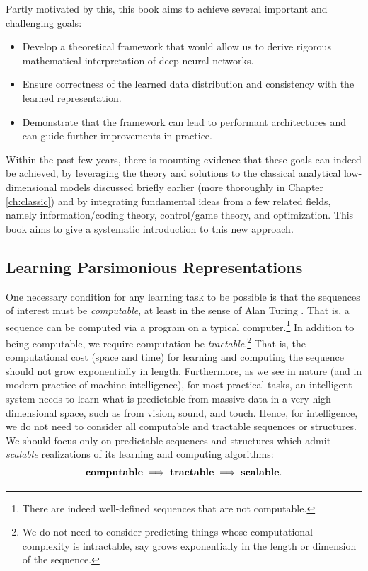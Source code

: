 \documentclass[../../book-main.tex]{subfiles}
\begin{document}
Partly motivated by this, this book aims to achieve several important and challenging goals: 
\begin{itemize}
    \item Develop a theoretical framework that would allow us to derive rigorous mathematical interpretation of deep neural networks.
    \item Ensure correctness of the learned data distribution and consistency with the learned representation.
    \item Demonstrate that the framework can lead to performant architectures and can guide further improvements in practice.
\end{itemize}
Within the past few years, there is mounting evidence that these goals can indeed be achieved, by leveraging the theory and solutions to the classical analytical low-dimensional models discussed briefly earlier (more thoroughly in Chapter \ref{ch:classic}) and by integrating fundamental ideas from a few related fields, namely information/coding theory, control/game theory, and optimization. This book aims to give a systematic introduction to this new approach.

\subsection{Learning Parsimonious Representations}
\label{sec:computational-approach-compression}
One necessary condition for any  learning task to be possible is that the sequences of interest must be {\em computable}, at least in the sense of Alan Turing \cite{Turing-1936}. That is, a sequence can be computed via a program on a typical computer.\footnote{There are indeed well-defined sequences that are not computable.} In addition to being computable, we require computation be {\em tractable}.\footnote{We do not need to consider predicting things whose computational complexity is intractable, say grows exponentially in the length or dimension of the sequence.} That is, the computational cost (space and time) for learning and computing the sequence should not grow exponentially in length. Furthermore, as we see in nature (and in modern practice of machine intelligence), for most practical tasks, an intelligent system needs to learn what is predictable from massive data in a very high-dimensional space, such as from vision, sound, and touch. Hence, for intelligence, we do not need to consider all computable and tractable sequences or structures. We should focus only on predictable sequences and structures which admit {\em scalable} realizations of its learning and computing algorithms:
\begin{equation}
\mbox{\textbf{computable}} \;
   \Longrightarrow \; \mbox{\textbf{tractable}} \; \Longrightarrow \; 
   \mbox{\textbf{scalable}}.
\end{equation}
\end{document}
